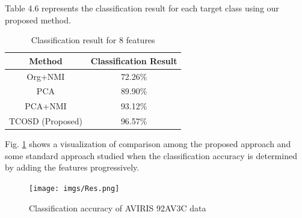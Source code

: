 \documentclass[document.tex]{subfiles}
\begin{document}
\noindent Table 4.6 represents the classification result for each target class using our proposed method.
\begin{table}[H]
	\caption{Classification result for 8 features}
	\begin{center}
		\begin{tabular}{|c|c|}
			\hline
			Method & Classification Result\\ \hline
			Org+NMI & 72.26\%\\ \hline
			PCA & 89.90\%\\ \hline
			PCA+NMI & 93.12\%\\ \hline
			TCOSD (Proposed)& 96.57\%\\ \hline
		\end{tabular}
	\end{center}
	\label{tab:Classification result for 8 features}
\end{table}
\noindent Fig. \ref{fig:Classification accuracy of AVIRIS 92AV3C data} shows a visualization of comparison among the proposed approach and some standard approach studied when the classification accuracy is determined by adding the features progressively.\\
\begin{figure}[H]
	\begin{center}
		\texttt{[image: imgs/Res.png]}
	\end{center}
	\caption{Classification accuracy of AVIRIS 92AV3C data}
	\label{fig:Classification accuracy of AVIRIS 92AV3C data}
\end{figure}
\end{document}

